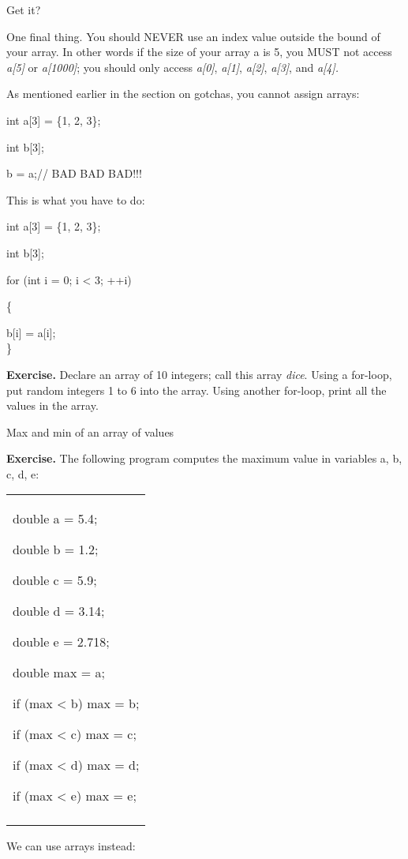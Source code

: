 \documentclass[
]{article}
\begin{document}
Get it?

One final thing. You should NEVER use an index value outside the bound
of your array. In other words if the size of your array a is 5, you MUST
not access \emph{a{[}5{]}} or \emph{a{[}1000{]}}; you should only access
\emph{a{[}0{]}}, \emph{a{[}1{]}}, \emph{a{[}2{]}}, \emph{a{[}3{]}}, and
\emph{a{[}4{]}.}

As mentioned earlier in the section on gotchas, you cannot assign
arrays:

int a{[}3{]} = \{1, 2, 3\};

int b{[}3{]};

b = a;// BAD BAD BAD!!!

This is what you have to do:

int a{[}3{]} = \{1, 2, 3\};

int b{[}3{]};

for (int i = 0; i \textless{} 3; ++i)

\{

b{[}i{]} = a{[}i{]};\\
\}

\textbf{Exercise.} Declare an array of 10 integers; call this array
\emph{dice}. Using a for-loop, put random integers 1 to 6 into the
array. Using another for-loop, print all the values in the array.

Max and min of an array of values

\textbf{Exercise.} The following program computes the maximum value in
variables a, b, c, d, e:

\begin{longtable}[]{@{}l@{}}
\toprule
\endhead
\begin{minipage}[t]{0.97\columnwidth}\raggedright
double a = 5.4;

double b = 1.2;

double c = 5.9;

double d = 3.14;

double e = 2.718;

double max = a;

if (max \textless{} b) max = b;

if (max \textless{} c) max = c;

if (max \textless{} d) max = d;

if (max \textless{} e) max = e;\strut
\end{minipage}\tabularnewline
\tabularnewline
\bottomrule
\end{longtable}

We can use arrays instead:
\end{document}
